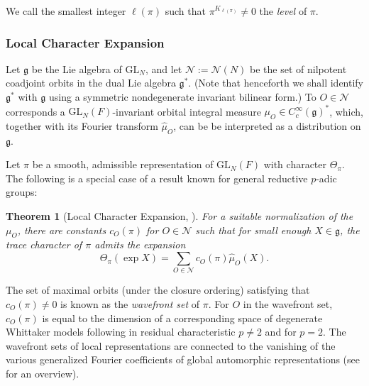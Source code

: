 \documentclass{amsart}
\newcommand{\wh}{\widehat}
\newcommand{\mf}[1]{\mathfrak{#1}}
\newcommand{\mc}[1]{\mathcal{#1}}
\newcommand{\GL}{\mathrm{GL}}
\newcommand{\1}{\m 1}
\newtheorem{thm}{Theorem}[subsection]
\theoremstyle{remark}
\theoremstyle{definition}
\newtheorem{dfn}[thm]{Definition}
\numberwithin{equation}{subsection}
\begin{document}
We call the smallest integer $\ell(\pi)$ such that $\pi^{K_{\ell(\pi)}} \neq 0$ the \emph{level} of $\pi$. 




\subsubsection{Local Character Expansion}\label{sec HCH intro}
Let $\mf g$ be the Lie algebra of $\GL_N$, and let $\mc N := \mc N(N)$ be the set of nilpotent coadjoint orbits in the dual Lie algebra $\mf  g^*$.  (Note that henceforth we shall identify $\mf g^*$ with $\mf g$ using a symmetric nondegenerate invariant bilinear form.)  To $O \in \mc N$ corresponds a $\GL_N(F)$-invariant orbital integral measure $\mu_O \in C^\infty_c(\mf g)^*$, which, together with its Fourier transform $\wh{\mu}_O$, can be be interpreted as a distribution on $\mf g$. 

Let $\pi$ be a smooth, admissible representation of $\GL_N(F)$ with character $\Theta_\pi$. The following is a special case of a result known for general reductive $p$-adic groups:

\begin{thm}[Local Character Expansion, \cite{HC99admissible,Howe74Fourier}]\label{thm:HCH}
For a suitable normalization of the $\mu_O$, there are constants $c_O(\pi)$ for $O \in \mc N$ such that for small enough $X \in \mf g$, %
the trace character of $\pi$ admits the expansion
\[
\Theta_\pi(\exp X) = \sum_{O \in \mc N} c_O(\pi) \wh \mu_O(X).
\]
\end{thm}

The set of maximal orbits (under the closure ordering) satisfying that $c_O(\pi)\neq 0$
is known as the \emph{wavefront set} of $\pi$.  For $O$ in the wavefront set, $c_O(\pi)$ is equal to the dimension of a corresponding space of degenerate Whittaker models following \cite[II.2 Proposition]{MW87} in residual characteristic $p \neq 2$ and \cite{Var14} for $p=2$. The wavefront sets of local representations are connected to the vanishing of the various generalized Fourier coefficients of global automorphic representations (see \cite{JL24wavefront} for an overview).%
\end{document}
